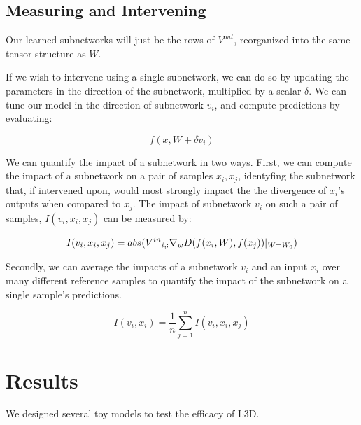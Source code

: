 \documentclass{article}
\theoremstyle{plain}
\theoremstyle{definition}
\theoremstyle{remark}
\begin{document}
\subsection{Measuring and Intervening}

Our learned subnetworks will just be the rows of $V^{out}$, reorganized into the same tensor structure as $W$.

If we wish to intervene using a single subnetwork, we can do so by updating the parameters in the direction of the subnetwork, multiplied by a scalar $\delta$. We can tune our model in the direction of subnetwork $v_i$, and compute predictions by evaluating:

\begin{equation}
    f(x, W + \delta v_i)
\end{equation}


We can quantify the impact of a subnetwork in two ways. First, we can compute the impact of a subnetwork on a pair of samples $x_i, x_j$, identyfing the subnetwork that, if intervened upon, would most strongly impact the the divergence of $x_i$'s outputs when compared to $x_j$. The impact of subnetwork $v_i$ on such a pair of samples, $I(v_i, x_i, x_j)$ can be measured by:

\begin{equation}
    I(v_i, x_i, x_j) = \\
    abs({V^{in}}_{i,:} \nabla_w D(f(x_i, W), f(x_j))|_{W=W_0})
\end{equation}

Secondly, we can average the impacts of a subnetwork $v_i$ and an input $x_i$ over many different reference samples to quantify the impact of the subnetwork on a single sample's predictions.

\begin{equation}
    I(v_i, x_i) = \frac{1}{n} \sum_{j=1}^{n} I(v_i, x_i, x_j)
\end{equation}


\section{Results}

We designed several toy models to test the efficacy of L3D.
\end{document}
